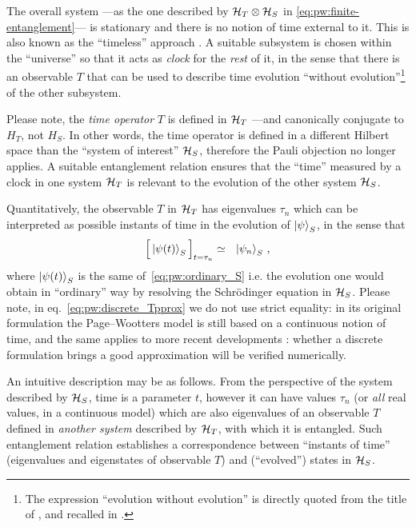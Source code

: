 The overall system
---as the one described by $\mathcal{H}_T \otimes \mathcal{H}_S$ in \eqref{eq:pw:finite-entanglement}---
is stationary and there is no notion
of time external to it.
This is also known as the
``timeless'' approach \parencite{Marletto:Evolution}.
\citereset
A suitable subsystem is chosen within the ``universe'' so that it acts as
\emph{clock} for the \emph{rest} of it, in the sense that
there is an observable $T$
that can be used to
describe time evolution ``without evolution''\footnote{
  The expression ``evolution without evolution''
  is directly quoted from the title of \cite{PageWootters},
  and recalled in \cite{Marletto:Evolution}.
}
of the other subsystem.

Please note,
the \emph{time operator} $T$ is defined in $\mathcal{H}_T$ ---and canonically conjugate to $H_T$, not $H_S$.
In other words, the time operator is defined in a different Hilbert space than the ``system of interest'' $\mathcal{H}_S$,
therefore
the Pauli objection no longer applies. A suitable entanglement relation ensures that 
the ``time'' measured by a clock in one system $\mathcal{H}_T$ is relevant to the evolution of the other
system $\mathcal{H}_S$.

Quantitatively,
the observable $T$ in $\mathcal{H}_T$
has eigenvalues $\tau_n$ which can be interpreted as possible
instants of time in the evolution of $\ket{\psi}_S$, in the sense that
\begin{equation}\label{eq:pw:discrete_Tpprox}
  \Big[ \ket{\psi(t)}_S \Big]_{t=\tau_n} \simeq \,\,\,\, \ket{\psi_n}_S \, \text{,}
\end{equation}
where $\ket{\psi(t)}_S$ is the same of~\eqref{eq:pw:ordinary_S} i.e.
the evolution one would obtain in ``ordinary'' way
by resolving the Schr\"{o}dinger equation in $\mathcal{H}_S$.
Please note, in eq.~\eqref{eq:pw:discrete_Tpprox} we do not use strict equality:
in its original formulation the Page--Wootters model is still based on a continuous
notion of time, and the same applies to more recent developments \parencite{Lloyd:Time}:
whether a discrete formulation
brings a good approximation
will be verified numerically.

An intuitive description may be as follows.
From the perspective of the system described by $\mathcal{H}_S$, time is a parameter $t$, however it can have values
$\tau_n$ (or \emph{all} real values, in a continuous model)
which are also eigenvalues of an observable $T$ defined in \emph{another system} described by $\mathcal{H}_T$,
with which it is entangled. Such entanglement relation establishes a correspondence
between ``instants of time'' (eigenvalues and eigenstates of observable $T$)
and (``evolved'') states in $\mathcal{H}_S$.

